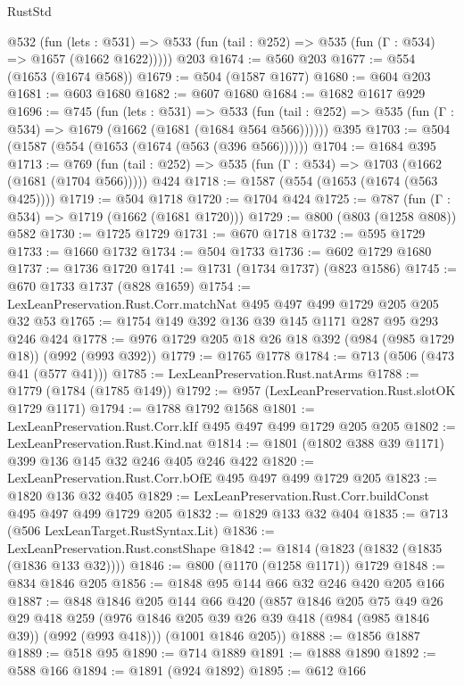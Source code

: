\begin{lexlean}{RustStd}
\begin{coremodule}
    @532
      (fun (lets : @531) =>
      @533 (fun (tail : @252) => @535 (fun (Γ : @534) => @1657 (@1662 @1622)))))
    @203
@1674 := @560 @203
@1677 := @554 (@1653 (@1674 @568))
@1679 := @504 (@1587 @1677)
@1680 := @604 @203
@1681 := @603 @1680
@1682 := @607 @1680
@1684 := @1682 @1617 @929
@1696 := @745
    (fun (lets : @531) =>
    @533 (fun (tail : @252) => @535 (fun (Γ : @534) => @1679 (@1662 (@1681 (@1684 @564 @566))))))
    @395
@1703 := @504 (@1587 (@554 (@1653 (@1674 (@563 (@396 @566))))))
@1704 := @1684 @395
@1713 := @769
    (fun (tail : @252) => @535 (fun (Γ : @534) => @1703 (@1662 (@1681 (@1704 @566)))))
    @424
@1718 := @1587 (@554 (@1653 (@1674 (@563 @425))))
@1719 := @504 @1718
@1720 := @1704 @424
@1725 := @787 (fun (Γ : @534) => @1719 (@1662 (@1681 @1720)))
@1729 := @800 (@803 (@1258 @808)) @582
@1730 := @1725 @1729
@1731 := @670 @1718
@1732 := @595 @1729
@1733 := @1660 @1732
@1734 := @504 @1733
@1736 := @602 @1729 @1680
@1737 := @1736 @1720
@1741 := @1731 (@1734 @1737) (@823 @1586)
@1745 := @670 @1733 @1737 (@828 @1659)
@1754 := LexLeanPreservation.Rust.Corr.matchNat @495 @497 @499 @1729 @205 @205 @32 @53
@1765 := @1754 @149 @392 @136 @39 @145 @1171 @287 @95 @293 @246 @424
@1778 := @976 @1729 @205 @18 @26 @18 @392 (@984 (@985 @1729 @18)) (@992 (@993 @392))
@1779 := @1765 @1778
@1784 := @713 (@506 (@473 @41 (@577 @41)))
@1785 := LexLeanPreservation.Rust.natArms
@1788 := @1779 (@1784 (@1785 @149))
@1792 := @957 (LexLeanPreservation.Rust.slotOK @1729 @1171)
@1794 := @1788 @1792 @1568
@1801 := LexLeanPreservation.Rust.Corr.kIf @495 @497 @499 @1729 @205 @205
@1802 := LexLeanPreservation.Rust.Kind.nat
@1814 := @1801 (@1802 @388 @39 @1171) @399 @136 @145 @32 @246 @405 @246 @422
@1820 := LexLeanPreservation.Rust.Corr.bOfE @495 @497 @499 @1729 @205
@1823 := @1820 @136 @32 @405
@1829 := LexLeanPreservation.Rust.Corr.buildConst @495 @497 @499 @1729 @205
@1832 := @1829 @133 @32 @404
@1835 := @713 (@506 LexLeanTarget.RustSyntax.Lit)
@1836 := LexLeanPreservation.Rust.constShape
@1842 := @1814 (@1823 (@1832 (@1835 (@1836 @133 @32))))
@1846 := @800 (@1170 (@1258 @1171)) @1729
@1848 := @834 @1846 @205
@1856 := @1848 @95 @144 @66 @32 @246 @420 @205 @166
@1887 := @848
    @1846
    @205
    @144
    @66
    @420
    (@857
      @1846
      @205
      @75
      @49
      @26
      @29
      @418
      @259
      (@976 @1846 @205 @39 @26 @39 @418 (@984 (@985 @1846 @39)) (@992 (@993 @418)))
      (@1001 @1846 @205))
@1888 := @1856 @1887
@1889 := @518 @95
@1890 := @714 @1889
@1891 := @1888 @1890
@1892 := @588 @166
@1894 := @1891 (@924 @1892)
@1895 := @612 @166

\end{coremodule}
\end{lexlean}
